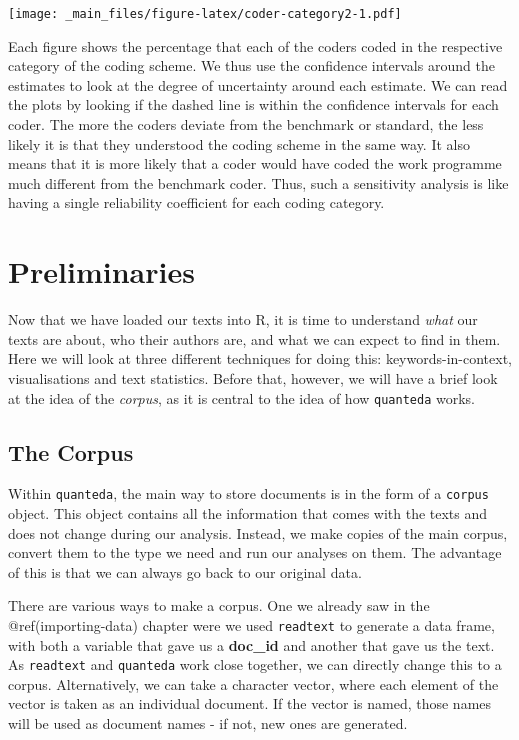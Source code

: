\documentclass[
]{book}
\begin{document}
\texttt{[image: \_main\_files/figure-latex/coder-category2-1.pdf]}

Each figure shows the percentage that each of the coders coded in the respective category of the coding scheme. We thus use the confidence intervals around the estimates to look at the degree of uncertainty around each estimate. We can read the plots by looking if the dashed line is within the confidence intervals for each coder. The more the coders deviate from the benchmark or standard, the less likely it is that they understood the coding scheme in the same way. It also means that it is more likely that a coder would have coded the work programme much different from the benchmark coder. Thus, such a sensitivity analysis is like having a single reliability coefficient for each coding category.

\chapter{Preliminaries}\label{preliminaries}

Now that we have loaded our texts into R, it is time to understand \emph{what} our texts are about, who their authors are, and what we can expect to find in them. Here we will look at three different techniques for doing this: keywords-in-context, visualisations and text statistics. Before that, however, we will have a brief look at the idea of the \emph{corpus}, as it is central to the idea of how \texttt{quanteda} works.

\section{The Corpus}\label{the-corpus}

Within \texttt{quanteda}, the main way to store documents is in the form of a \texttt{corpus} object. This object contains all the information that comes with the texts and does not change during our analysis. Instead, we make copies of the main corpus, convert them to the type we need and run our analyses on them. The advantage of this is that we can always go back to our original data.

There are various ways to make a corpus. One we already saw in the @ref(importing-data) chapter were we used \texttt{readtext} to generate a data frame, with both a variable that gave us a \textbf{doc\_id} and another that gave us the text. As \texttt{readtext} and \texttt{quanteda} work close together, we can directly change this to a corpus. Alternatively, we can take a character vector, where each element of the vector is taken as an individual document. If the vector is named, those names will be used as document names - if not, new ones are generated.
\end{document}
